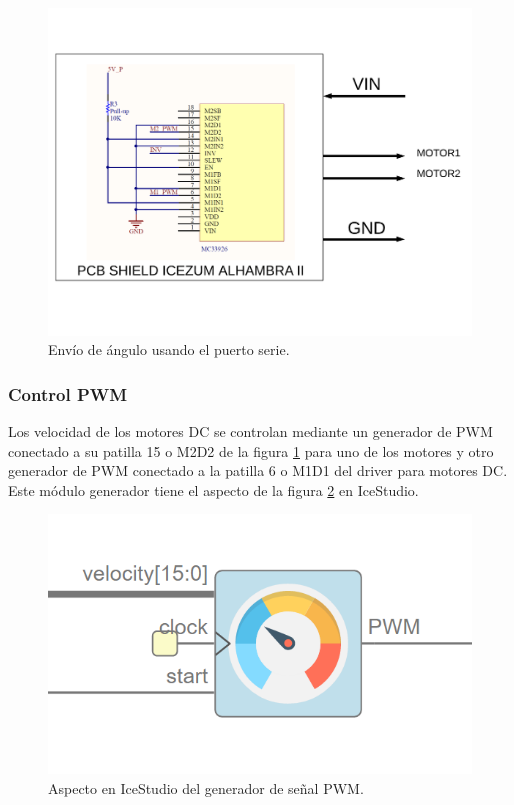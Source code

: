 \begin{figure}[H]
	\center
	\includegraphics[trim = 0mm 3cm 0mm 2cm, clip,scale=0.6]{imagenes/Balancing_robot/driver_motor.pdf}
	\caption{Envío de ángulo usando el puerto serie.}
	\label{fig:driver_motor}
\end{figure}




\subsubsection{Control PWM}

Los velocidad de los motores DC se controlan mediante un generador de PWM conectado a su patilla 15 o M2D2 de la figura \ref{fig:driver_motor} para uno de los motores y otro generador de PWM conectado a la patilla 6 o M1D1 del driver para motores DC. Este módulo generador tiene el aspecto de la figura \ref{fig:pwm_module} en IceStudio. 

\begin{figure}[H]
	\center
	\includegraphics[scale=0.5]{imagenes/Balancing_robot/PWM_module.PNG}
	\caption{Aspecto en IceStudio del generador de señal PWM.}
	\label{fig:pwm_module}
\end{figure}

